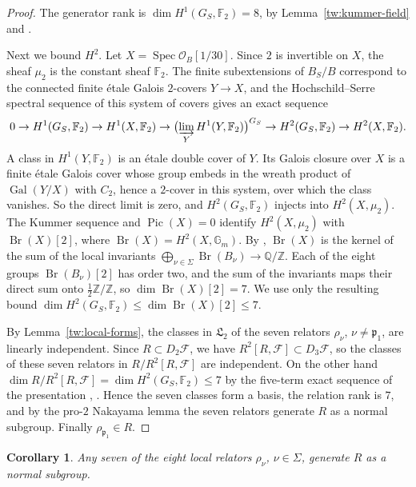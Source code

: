 \documentclass[11pt]{amsart}
\numberwithin{equation}{section}
\newtheorem{corollary}[equation]{Corollary}
\theoremstyle{definition}
\theoremstyle{remark}
\DeclareMathOperator{\Gal}{Gal}
\DeclareMathOperator{\Br}{Br}
\DeclareMathOperator{\Pic}{Pic}
\newcommand{\Ftwo}{\mathbb F_2}
\newcommand{\Q}{\mathbb Q}
\newcommand{\Z}{\mathbb Z}
\begin{document}
\begin{proof}
The generator rank is $\dim H^1(G_S,\Ftwo)=8$, by
Lemma~\ref{tw:kummer-field} and
\cite[Proposition~3.9.1]{NeukirchSchmidtWingberg2008}.

Next we bound $H^2$. Let $X=\operatorname{Spec}\mathcal O_B[1/30]$. Since
$2$ is invertible on $X$, the sheaf $\mu_2$ is the constant sheaf $\Ftwo$.
The finite subextensions of $B_S/B$ correspond to the connected finite étale
Galois $2$-covers $Y\to X$, and the Hochschild--Serre spectral sequence of
this system of covers \cite[Theorem~14.9 and Remark~14.10]{MilneEtale} gives an exact
sequence
\[
 0\to H^1(G_S,\Ftwo)\to H^1(X,\Ftwo)\to
 \bigl(\varinjlim_Y H^1(Y,\Ftwo)\bigr)^{G_S}\to
 H^2(G_S,\Ftwo)\to H^2(X,\Ftwo).
\]
A class in $H^1(Y,\Ftwo)$ is an étale double cover of $Y$. Its Galois closure
over $X$ is a finite étale Galois cover whose group embeds in the wreath
product of $\Gal(Y/X)$ with $C_2$, hence a $2$-cover in this system, over which
the class vanishes. So the direct limit is zero, and
$H^2(G_S,\Ftwo)$ injects into $H^2(X,\mu_2)$. The Kummer sequence and
$\Pic(X)=0$ identify $H^2(X,\mu_2)$ with $\Br(X)[2]$, where
$\Br(X)=H^2(X,\mathbb G_m)$. By \cite[Theorem~6.8.3 and
Example~6.9.4]{Poonen}, $\Br(X)$ is the kernel of the sum of the local
invariants $\bigoplus_{\nu\in\Sigma}\Br(B_\nu)\to\Q/\Z$. Each of the eight
groups $\Br(B_\nu)[2]$ has order two, and the sum of the invariants maps their
direct sum onto $\frac12\Z/\Z$, so $\dim\Br(X)[2]=7$. We use only the
resulting bound $\dim H^2(G_S,\Ftwo)\le\dim\Br(X)[2]\le7$.

By Lemma~\ref{tw:local-forms}, the classes in $\mathfrak L_2$ of the seven
relators $\rho_\nu$, $\nu\ne\mathfrak p_1$, are linearly independent. Since
$R\subset D_2\mathcal F$, we have $R^2[R,\mathcal F]\subset D_3\mathcal F$, so
the classes of these seven relators in $R/R^2[R,\mathcal F]$ are independent.
On the other hand
$\dim R/R^2[R,\mathcal F]=\dim H^2(G_S,\Ftwo)\le7$ by the five-term
exact sequence of the presentation
\cite[Proposition~3.9.5]{NeukirchSchmidtWingberg2008},
\cite[(3.3)--(3.4)]{Quadrelli2021}. Hence the seven classes form a basis, the
relation rank is $7$, and by the pro-$2$ Nakayama lemma
\cite[Corollary~3.9.3]{NeukirchSchmidtWingberg2008} the seven relators
generate $R$ as a normal subgroup. Finally $\rho_{\mathfrak p_1}\in R$.
\end{proof}

\begin{corollary}\label{tw:any-seven}
Any seven of the eight local relators $\rho_\nu$, $\nu\in\Sigma$, generate
$R$ as a normal subgroup.
\end{corollary}
\end{document}
